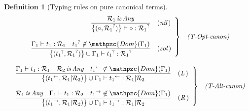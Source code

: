 \documentclass[12pt]{article}
\newtheorem{Definition}{Definition}[section]
\begin{document}
\begin{Definition}[Typing rules on pure canonical terms]
\begin{displaymath}
\begin{array}{c}
      \begin{array}{rl}
        \left. \begin{array}{rl}
          \dfrac{
            \mathcal{R}_1 \,\text{\it is}\, \text{\it Any}
          }{
            \bigl\{(\circ, {\mathcal{R}_1}^? ) \bigr\} \vdash
            \circ : {\mathcal{R}_1}^?
          }  &  (\text{\it nil}\,)  \\
          \\
          \dfrac{
            \Gamma_1 \vdash t_1 : \mathcal{R}_1
            \quad {t_1}^? \not\in \mathpzc{Dom}(\Gamma_1)
          }{
            \bigl\{({t_1}^?, {\mathcal{R}_1}^?) \bigr\} \cup \Gamma_1 \vdash
                   {t_1}^? : {\mathcal{R}_1}^?
          }  &  (\text{\it sol}\,)
        \end{array} \right\}  &  \text{\it (T-Opt-canon)}
      \end{array}  \\
      
      \\
      \begin{array}{rl}
        \left. \begin{array}{rl}
          \dfrac{
            \Gamma_1 \vdash t_1 : \mathcal{R}_1
            \quad \mathcal{R}_2 \,\text{\it is}\, \text{\it Any}
            \quad {t_1}^{\leftarrow} \not\in \mathpzc{Dom}(\Gamma_1)
          }{
            \bigl\{({t_1}^\leftarrow, \mathcal{R}_1 | \mathcal{R}_2)
             \bigr\} \cup \Gamma_1 \vdash {t_1}^\leftarrow :
              \mathcal{R}_1 | \mathcal{R}_2
          }  &  (\text{\it L}\,)  \\
          \\
          \dfrac{
            \mathcal{R}_1 \,\text{\it is}\, \text{\it Any}
            \quad \Gamma_1 \vdash t_1 : \mathcal{R}_2
            \quad {t_1}^{\rightarrow} \not\in \mathpzc{Dom}(\Gamma_1)
          }{
            \bigl\{({t_1}^{\rightarrow}, \mathcal{R}_1 | \mathcal{R}_2)
             \bigr\} \cup \Gamma_1 \vdash {t_1}^\rightarrow :
              \mathcal{R}_1 | \mathcal{R}_2
          }  &  (\text{\it R}\,)
        \end{array} \right\}  &  \text{\it (T-Alt-canon)}
      \end{array}  
    \end{array}
  \end{displaymath}  
\end{Definition}
\end{document}
